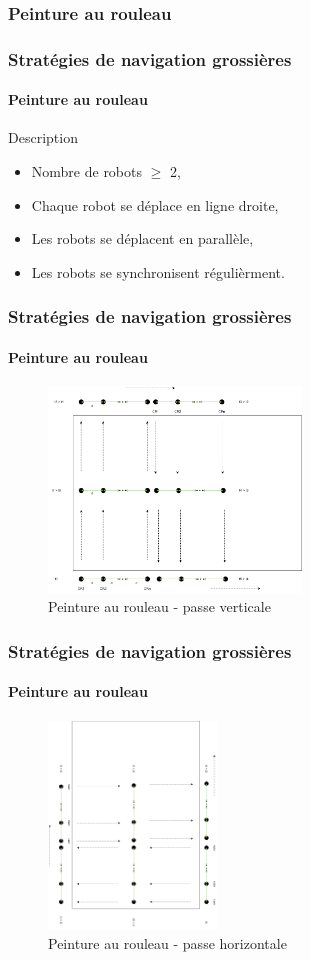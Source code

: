 \documentclass{beamer}
\begin{document}
			\subsubsection{Peinture au rouleau}
				\begin{frame}
					\frametitle{Stratégies de navigation grossières}
					\framesubtitle{Peinture au rouleau}
					\begin{block}{Description}
						\begin{itemize}
							\item Nombre de robots $\ge$ 2,
							\item Chaque robot se déplace en ligne droite,
							\item Les robots se déplacent en parallèle,
							\item Les robots se synchronisent régulièrment.
						\end{itemize}
					\end{block}
				\end{frame}
				\begin{frame}
					\frametitle{Stratégies de navigation grossières}
					\framesubtitle{Peinture au rouleau}
					\begin{figure}
						\centering
						\includegraphics[width=0.6\textwidth]{graphics/peinture_au_rouleau1.png}
						\caption{Peinture au rouleau - passe verticale}
					\end{figure}
				\end{frame}
				\begin{frame}
					\frametitle{Stratégies de navigation grossières}
					\framesubtitle{Peinture au rouleau}
					\begin{figure}
						\centering
						\includegraphics[width=0.4\textwidth]{graphics/peinture_au_rouleau2.png}
						\caption{Peinture au rouleau - passe horizontale}
					\end{figure}
				\end{frame}
\end{document}
